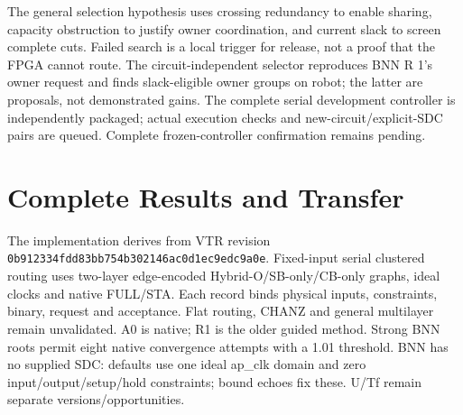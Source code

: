 \documentclass[conference,10pt]{IEEEtran}
\begin{document}
The general selection hypothesis uses crossing redundancy to enable sharing, capacity obstruction to justify owner coordination, and current slack to screen complete cuts. Failed search is a local trigger for release, not a proof that the FPGA cannot route. The circuit-independent selector reproduces BNN R 1's owner request and finds slack-eligible owner groups on robot; the latter are proposals, not demonstrated gains. The complete serial development controller is independently packaged; actual execution checks and new-circuit/explicit-SDC pairs are queued. Complete frozen-controller confirmation remains pending.
\section{Complete Results and Transfer}
The implementation derives from VTR revision \texttt{0b912334fdd83bb754b302146ac0d1ec9edc9a0e}. Fixed-input serial clustered routing uses two-layer edge-encoded Hybrid-O/SB-only/CB-only graphs, ideal clocks and native FULL/STA. Each record binds physical inputs, constraints, binary, request and acceptance. Flat routing, CHANZ and general multilayer remain unvalidated. A0 is native; R1 is the older guided method. Strong BNN roots permit eight native convergence attempts with a 1.01 threshold. BNN has no supplied SDC: defaults use one ideal ap\_clk domain and zero input/output/setup/hold constraints; bound echoes fix these. U/Tf remain separate versions/opportunities.
\end{document}
